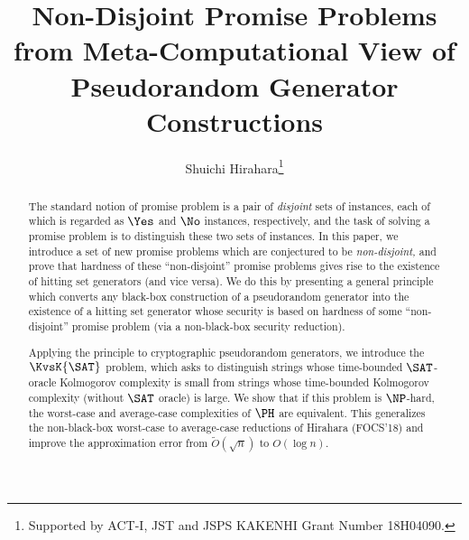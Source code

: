 \documentclass{toc}
\begin{document}
\begin{frontmatter}%


  \title{Non-Disjoint Promise Problems from Meta-Computational View of \\ Pseudorandom Generator Constructions%
    }  %







  \author[hirahara]{Shuichi Hirahara\thanks{Supported by ACT-I, JST and JSPS KAKENHI Grant Number 18H04090.}}



  \begin{abstract}
    The standard notion of promise problem is a pair of \emph{disjoint} sets of instances, each of which is regarded as $\Yes$ and $\No$ instances, respectively,
    and the task of solving a promise problem is to distinguish these two sets of instances.
    In this paper, we introduce a set of
    new promise problems which are conjectured to be \emph{non-disjoint,}
    and prove that hardness of these ``non-disjoint'' promise problems
    gives rise to
    the existence of hitting set generators (and vice versa).
    We do this by presenting a general principle which converts
    any black-box construction of a pseudorandom generator
    into the existence of a hitting set generator
    whose security is based on hardness of some ``non-disjoint'' promise problem (via a non-black-box security reduction).

    Applying the principle to cryptographic pseudorandom generators,
    we introduce the $\KvsK{\SAT}$ problem, which asks to distinguish strings whose time-bounded $\SAT$-oracle Kolmogorov complexity is small from strings whose time-bounded Kolmogorov complexity (without $\SAT$ oracle) is large.
    We show that if this problem is $\NP$-hard,
    the worst-case and average-case 
%
complexities of $\PH$ are equivalent.  %
    This generalizes the non-black-box worst-case to average-case reductions of Hirahara (FOCS'18) and improve the approximation error from $\widetilde{O}(\sqrt{n})$ to $O(\log n)$.


\end{abstract}
\end{frontmatter}
\end{document}
